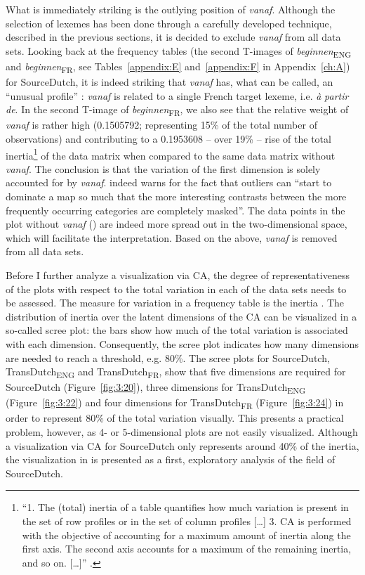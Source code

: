 What is immediately striking is the outlying position of \textit{vanaf}. Although the selection of lexemes has been done through a carefully developed technique, described in the previous sections, it is decided to exclude \textit{vanaf} from all data sets. Looking back at the frequency tables (the second T-images of \textit{beginnen}\textsubscript{ENG} and \textit{beginnen}\textsubscript{FR}, see Tables~\ref{appendix:E} and~\ref{appendix:F} in Appendix~\ref{ch:A}) for SourceDutch, it is indeed striking that \textit{vanaf} has, what can be called, an “unusual profile” \citep[92]{greenacre_correspondence_2007}: \textit{vanaf} is related to a single French target lexeme, i.e. \textit{à} \textit{partir} \textit{de}. In the second T-image of \textit{beginnen}\textsubscript{FR}, we also see that the relative weight of \textit{vanaf} is rather high (0.1505792; representing 15\% of the total number of observations) and contributing to a 0.1953608 – over 19\% – rise of the total inertia\footnote{“1. The (total) inertia of a table quantifies how much variation is present in the set of row profiles or in the set of column profiles […] 3. CA is performed with the objective of accounting for a maximum amount of inertia along the first axis. The second axis accounts for a maximum of the remaining inertia, and so on. […]” \citep[88]{greenacre_correspondence_2007}.} of the data matrix when compared to the same data matrix without \textit{vanaf}. The conclusion is that the variation of the first dimension is solely accounted for by \textit{vanaf}. \citet[92]{greenacre_correspondence_2007} indeed warns for the fact that outliers can “start to dominate a map so much that the more interesting contrasts between the more frequently occurring categories are completely masked”. The data points in the plot without \textit{vanaf} () are indeed more spread out in the two-dimensional space, which will facilitate the interpretation. Based on the above, \textit{vanaf} is removed from all data sets.

Before I further analyze a visualization via CA, the degree of representativeness of the plots with respect to the total variation in each of the data sets needs to be assessed. The measure for variation in a frequency table is the inertia \citep{greenacre_correspondence_2007}. The distribution of inertia over the latent dimensions of the CA can be visualized in a so-called scree plot: the bars show how much of the total variation is associated with each dimension. Consequently, the scree plot indicates how many dimensions are needed to reach a threshold, e.g. 80\%. The scree plots for SourceDutch, TransDutch\textsubscript{ENG} and TransDutch\textsubscript{FR}, show that five dimensions are required for SourceDutch (Figure~\ref{fig:3:20}), three dimensions for TransDutch\textsubscript{ENG} (Figure~\ref{fig:3:22}) and four dimensions for TransDutch\textsubscript{FR} (Figure~\ref{fig:3:24}) in order to represent 80\% of the total variation visually. This presents a practical problem, however, as 4- or 5-dimensional plots are not easily visualized. Although a visualization via CA for SourceDutch only represents around 40\% of the inertia, the visualization in  is presented as a first, exploratory analysis of the field of SourceDutch.

